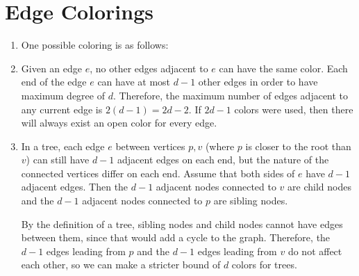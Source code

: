 \documentclass{article}
\begin{document}
	\section{Edge Colorings}
	\begin{enumerate}[label=\alph*.]
		\item One possible coloring is as follows:
		\begin{center}
		\end{center}
		\item Given an edge $e$, no other edges adjacent to $e$ can have the same color. Each end of the edge 
		$e$ can have at most $d-1$ other edges in order to have maximum degree of $d$. Therefore,
		the maximum number of edges adjacent to any current edge is $2(d-1) = 2d-2$. If $2d-1$ colors 
		were used, then there will always exist an open color for every edge.
		\item In a tree, each edge $e$ between vertices $p, v$ (where $p$ is closer to the root than $v$)
		can still have $d-1$ adjacent edges on each end, but the nature of 
		the connected vertices differ on each end. Assume that both sides of $e$ have $d-1$ adjacent edges. 
		Then the $d-1$ adjacent nodes connected to $v$ are child nodes and the $d-1$ adjacent nodes 
		connected to $p$ are sibling nodes.

		By the definition of a tree, sibling nodes and child nodes cannot have edges between them, since 
		that would add a cycle to the graph. Therefore, the $d-1$ edges leading from $p$ and the $d-1$ 
		edges leading from $v$ do not affect each other, so we can make a stricter bound of $d$ colors
		for trees.
	\end{enumerate}
\end{document}
